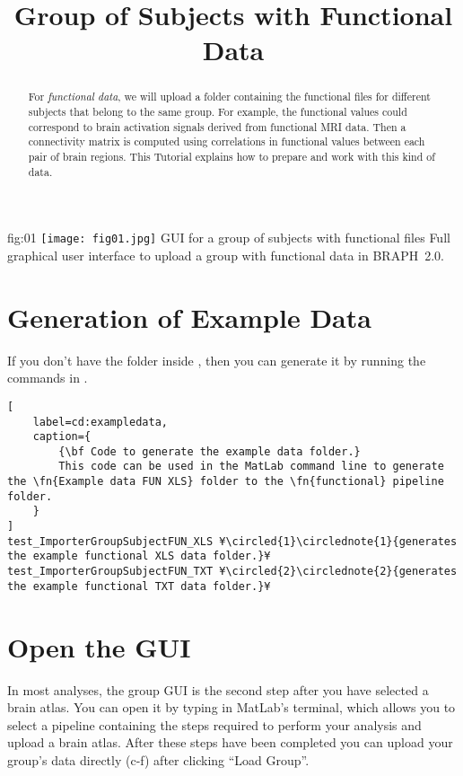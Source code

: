 \documentclass[justified]{tufte-handout}
\title{Group of Subjects with Functional Data}
\begin{document}
\maketitle

\begin{abstract}
\noindent
For \emph{functional data}, we will upload a folder containing the functional files for different subjects that belong to the same group. For example, the functional values could correspond to brain activation signals derived from functional MRI data. Then a connectivity matrix is computed using correlations in functional values between each pair of brain regions. This Tutorial explains how to prepare and work with this kind of data.
\end{abstract}

\tableofcontents

	{fig:01}
	{\texttt{[image: fig01.jpg]}}
	{GUI for a group of subjects with functional files}
	{
	Full graphical user interface to upload a group with functional data in BRAPH~2.0. 
	}

\clearpage
\section{Generation of Example Data}

If you don't have the  folder inside , then you can generate it by running the commands in .

\begin{lstlisting}[
	label=cd:exampledata,
	caption={
		{\bf Code to generate the example data folder.}
		This code can be used in the MatLab command line to generate the \fn{Example data FUN XLS} folder to the \fn{functional} pipeline folder.
	}
]
test_ImporterGroupSubjectFUN_XLS ¥\circled{1}\circlednote{1}{generates the example functional XLS data folder.}¥
test_ImporterGroupSubjectFUN_TXT ¥\circled{2}\circlednote{2}{generates the example functional TXT data folder.}¥
\end{lstlisting}

\section{Open the GUI}

In most analyses, the group GUI is the second step after you have selected a brain atlas. You can open it by typing  in MatLab's terminal, which allows you to select a pipeline containing the steps required to perform your analysis and upload a brain atlas. After these steps have been completed you can upload your group's data directly (c-f) after clicking ``Load Group''. 
\end{document}
